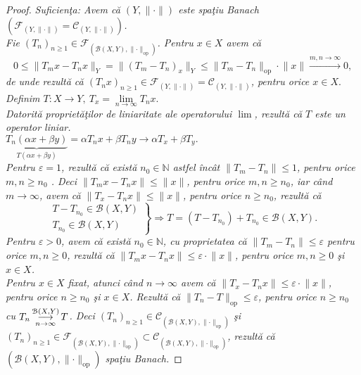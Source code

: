 \documentclass[ a4paper, 12pt]{report}
\theoremstyle{definition}
\theoremstyle{remark}
\numberwithin{equation}{section}
\begin{document}
\begin{proof}
\it{Suficien\c ta}:
Avem c\u a $(Y,\lVert \cdot \rVert)$ este spa\c tiu Banach $(\mathcal{F}_{(Y,\lVert \cdot \rVert)}= \mathcal{C}_{(Y,\lVert \cdot \rVert)})$.\\
Fie $(T_n)_{n \geq 1} \in \mathcal{F}_{\left( \mathcal{B}(X,Y),\lVert \cdot \rVert_{\mbox{op}}\right)}$.
Pentru  $x \in X$ avem c\u a $$0 \leq
\lVert T_m x - T_n x \rVert_{Y} = \lVert (T_m - T_n )_x \rVert_{Y} \leq \lVert T_m-T_n  \rVert_{\mbox{op}} \cdot \lVert x \rVert \stackrel{m,n \rightarrow \infty}{\longrightarrow} 0, $$
 de unde rezult\u a  c\u a $(T_n x)_{n \geq 1} \in \mathcal{F}_{(Y,\lVert \cdot \rVert)} = \mathcal{C}_{(Y,\lVert \cdot \rVert)}$, pentru orice $x \in X.$\\
Definim $T : X \rightarrow Y,\  T_x = \lim\limits_{n \rightarrow \infty}T_n x.$\\
Datorit\u a propriet\u a\c tilor  de liniaritate ale operatorului $\lim$, rezult\u a c\u a $T$ este un operator liniar.\\
$\underbrace{T_n(\alpha x + \beta y)}_{T(\alpha x+\beta y)} = \alpha T_n x + \beta T_n y \longrightarrow \alpha T_x + \beta T_y.$\\
Pentru $\varepsilon = 1$, rezult\u a c\u a exist\u a $n_0 \in \mathbb{N}$ astfel \^inc\^at $\lVert T_m-T_n \rVert \leq 1$, pentru orice $m,n \geq n_0$ . Deci $\lVert T_m x - T_n x \rVert \leq \lVert x \rVert$, pentru orice $m,n \geq n_0$, iar c\^and $m \longrightarrow \infty$, avem c\u a  $\lVert T_x - T_n x \rVert \leq \lVert x \rVert$, pentru orice $n \geq n_0$, rezult\u a c\u a
\begin{equation*}
  \left.\begin{aligned}
         T - T_{n_0} \in \mathcal{B}(X,Y)\\
         T_{n_0} \in \mathcal{B}(X,Y)
        \end{aligned}
  \right\}
  \mbox{$\Rightarrow T = (T - T_{n_0}) + T_{n_0} \in \mathcal{B}(X,Y)$.}
 \end{equation*}
Pentru $\varepsilon >0$, avem c\u a exist\u a $n_0 \in \mathbb{N}$, cu proprietatea c\u a $\lVert T_m - T_n \rVert \leq \varepsilon$ pentru orice $m,n \geq 0$, rezult\u a c\u a $\lVert T_m x - T_n x \rVert \leq \varepsilon \cdot  \lVert x \rVert$, pentru orice $m,n \geq 0$ \c si $x \in X$.\\
Pentru $x \in X$ fixat, atunci c\^and $n \longrightarrow \infty$ avem c\u a $\lVert T_x - T_n x \rVert \leq \varepsilon \cdot  \lVert x \rVert$, pentru orice $n \geq n_0$ \c si $x \in X$. Rezult\u a c\u a $\lVert T_n - T \rVert_{\mbox{op}} \leq \varepsilon$, pentru orice $n \geq n_0$ cu  $T_n \pound\limits_{n \rightarrow \infty}^{\mathcal{B}(X,Y)} T$. Deci $(T_n)_{n \geq 1} \in \mathcal{C}_{\left( \mathcal{B}(X,Y),  \lVert \cdot \rVert_{\mbox{op}}\right)}$ \c si  $(T_n)_{n \geq 1} \in \mathcal{F}_{\left( \mathcal{B}(X,Y),  \lVert \cdot \rVert_{\mbox{op}}\right)} \subset \mathcal{C}_{\left( \mathcal{B}(X,Y),  \lVert \cdot \rVert_{\mbox{op}}\right)}$, rezult\u a  c\u a $\left( \mathcal{B}(X,Y),  \lVert \cdot \rVert_{\mbox{op}}\right) $ spa\c tiu Banach.



\end{proof}
\end{document}
